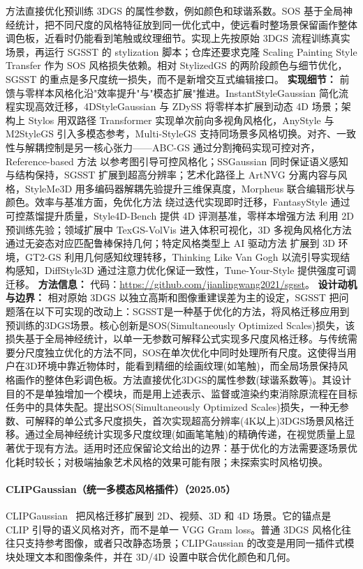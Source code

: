 方法直接优化预训练 3DGS 的属性参数，例如颜色和球谐系数。SOS 基于全局神经统计，把不同尺度的风格特征放到同一优化式中，使远看时整场景保留画作整体调色板，近看时仍能看到笔触或纹理细节。实现上先按原始 3DGS 流程训练真实场景，再运行 SGSST 的 stylization 脚本；仓库还要求克隆 Scaling Painting Style Transfer 作为 SOS 风格损失依赖。相对 StylizedGS 的两阶段颜色与细节优化，SGSST 的重点是多尺度统一损失，而不是新增交互式编辑接口。
\textbf{实现细节：} 前馈与零样本风格化沿"效率提升"与"模态扩展"推进。InstantStyleGaussian 简化流程实现高效迁移，4DStyleGaussian 与 ZDySS 将零样本扩展到动态 4D 场景；架构上 Stylos 用双路径 Transformer 实现单次前向多视角风格化，AnyStyle 与 M2StyleGS 引入多模态参考，Multi-StyleGS 支持同场景多风格切换。对齐、一致性与解耦控制是另一核心张力——ABC-GS 通过分割掩码实现可控对齐，Reference-based 方法 以参考图引导可控风格化；SSGaussian 同时保证语义感知与结构保持，SGSST 扩展到超高分辨率；艺术化路径上 ArtNVG 分离内容与风格，StyleMe3D 用多编码器解耦先验提升三维保真度，Morpheus 联合编辑形状与颜色。效率与基准方面，免优化方法 绕过迭代实现即时迁移，FantasyStyle 通过可控蒸馏提升质量，Style4D-Bench 提供 4D 评测基准，零样本增强方法 利用 2D 预训练先验；领域扩展中 TexGS-VolVis 进入体积可视化，3D 多视角风格化方法 通过无姿态对应匹配鲁棒保持几何；特定风格类型上 AI 驱动方法 扩展到 3D 环境，GT2-GS 利用几何感知纹理转移，Thinking Like Van Gogh 以流引导实现结构感知，DiffStyle3D 通过注意力优化保证一致性，Tune-Your-Style 提供强度可调迁移。
\textbf{方法信息：} 代码：\url{https://github.com/jianlingwang2021/sgsst}。
\textbf{设计动机与边界：} 相对原始 3DGS 以独立高斯和图像重建误差为主的设定，SGSST 把问题落在以下可实现的改动上：SGSST是一种基于优化的方法，将风格迁移应用到预训练的3DGS场景。核心创新是SOS(Simultaneously Optimized Scales)损失，该损失基于全局神经统计，以单一无参数可解释公式实现多尺度风格迁移。与传统需要分尺度独立优化的方法不同，SOS在单次优化中同时处理所有尺度。这使得当用户在3D环境中靠近物体时，能看到精细的绘画纹理(如笔触)，而全局场景保持风格画作的整体色彩调色板。方法直接优化3DGS的属性参数(球谐系数等)。其设计目的不是单独增加一个模块，而是用上述表示、监督或渲染约束消除原流程在目标任务中的具体失配。提出SOS(Simultaneously Optimized Scales)损失，一种无参数、可解释的单公式多尺度损失，首次实现超高分辨率(4K以上)3DGS场景风格迁移。通过全局神经统计实现多尺度纹理(如画笔笔触)的精确传递，在视觉质量上显著优于现有方法。适用时还应保留论文给出的边界：基于优化的方法需要逐场景优化耗时较长；对极端抽象艺术风格的效果可能有限；未探索实时风格切换。
\paragraph{CLIPGaussian（统一多模态风格插件）（2025.05）}
CLIPGaussian~\cite{2505_22854} 把风格迁移扩展到 2D、视频、3D 和 4D 场景。它的锚点是 CLIP 引导的语义风格对齐，而不是单一 VGG Gram loss。普通 3DGS 风格化往往只支持参考图像，或者只改静态场景；CLIPGaussian 的改变是用同一插件式模块处理文本和图像条件，并在 3D/4D 设置中联合优化颜色和几何。

